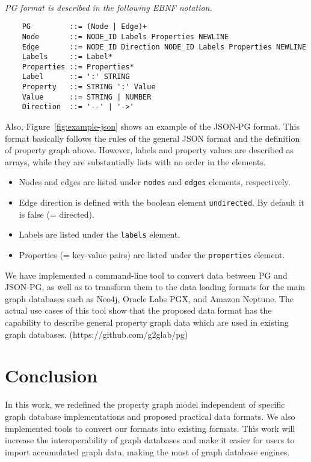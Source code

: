 \documentclass[runningheads]{llncs}
\begin{document}
\begin{defi}[PG Format]
\leavevmode \vspace{1mm} \\
\emph{PG format is described in the following EBNF notation.}
\begin{scriptsize}
\begin{verbatim}
    PG         ::= (Node | Edge)+
    Node       ::= NODE_ID Labels Properties NEWLINE
    Edge       ::= NODE_ID Direction NODE_ID Labels Properties NEWLINE
    Labels     ::= Label*
    Properties ::= Properties*
    Label      ::= ':' STRING
    Property   ::= STRING ':' Value
    Value      ::= STRING | NUMBER
    Direction  ::= '--' | '->'
\end{verbatim}
\end{scriptsize}
\end{defi}

Also, Figure~\ref{fig:example-json} shows an example of the JSON-PG format. This format basically follows the rules of the general JSON format and the definition of property graph above. However, labels and property values are described as arrays, while they are substantially lists with no order in the elements.  

\begin{itemize}
    \item Nodes and edges are listed under \texttt{nodes} and \texttt{edges} elements, respectively.
    \item Edge direction is defined with the boolean element \texttt{undirected}. By default it is false (= directed).
    \item Labels are listed under the \texttt{labels} element.
    \item Properties (= key-value pairs) are listed under the \texttt{properties} element.
\end{itemize}

We have implemented a command-line tool to convert data between PG and JSON-PG, as well as to transform them to the data loading formats for the main graph databases such as Neo4j, Oracle Labs PGX, and Amazon Neptune. The actual use cases of this tool show that the proposed data format has the capability to describe general property graph data which are used in existing graph databases. (https://github.com/g2glab/pg)

\section{Conclusion}
In this work, we redefined the property graph model independent of specific graph database implementations and proposed practical data formats. We also implemented tools to convert our formats into existing formats. 
This work will increase the interoperability of graph databases and make it easier for users to import accumulated graph data, making the most of graph database engines.
\end{document}
